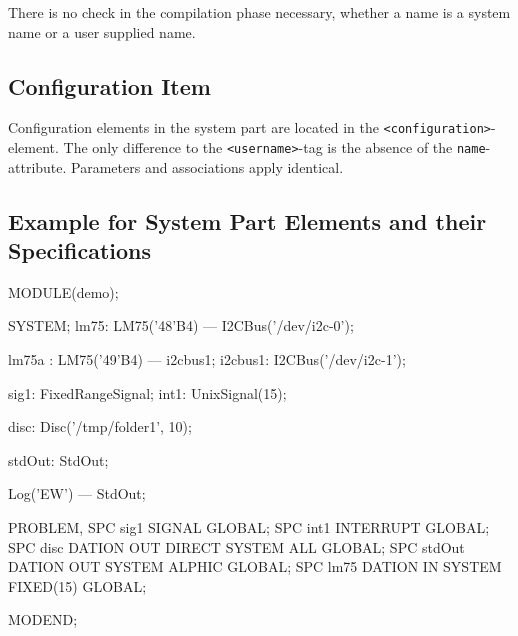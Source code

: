 There is no check in the compilation phase necessary,
whether a name is a system name
or a user supplied name.

\subsection{Configuration Item}
Configuration elements in the system part are located in the
\verb|<configuration>|-element. 
The only difference to the \verb|<username>|-tag is the absence of the 
\verb|name|-attribute. Parameters and associations apply identical.

\subsection{Example for System Part Elements and their Specifications}
\begin{PEARLCode}
MODULE(demo);

SYSTEM;
lm75: LM75('48'B4) --- I2CBus('/dev/i2c-0');

lm75a : LM75('49'B4) --- i2cbus1;
i2cbus1: I2CBus('/dev/i2c-1');

sig1: FixedRangeSignal;
int1: UnixSignal(15);

disc: Disc('/tmp/folder1', 10);

stdOut: StdOut;

Log('EW') --- StdOut;

PROBLEM,
SPC sig1 SIGNAL GLOBAL;
SPC int1 INTERRUPT GLOBAL;
SPC disc DATION OUT DIRECT SYSTEM ALL GLOBAL;
SPC stdOut DATION OUT SYSTEM ALPHIC GLOBAL;
SPC lm75 DATION IN SYSTEM FIXED(15) GLOBAL;

MODEND;
\end{PEARLCode}

